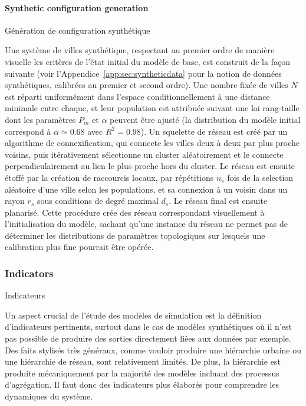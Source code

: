 \paragraph{Synthetic configuration generation}{Génération de configuration synthétique}

Une système de villes synthétique, respectant au premier ordre de manière visuelle les critères de l'état initial du modèle de base, est construit de la façon suivante (voir l'Appendice~\ref{app:sec:syntheticdata} pour la notion de données synthétiques, calibrées au premier et second ordre). Une nombre fixée de villes $N$ est réparti uniformément dans l'espace conditionnellement à une distance minimale entre chaque, et leur population est attribuée suivant une loi rang-taille dont les paramètres $P_{m}$ et $\alpha$ peuvent être ajusté (la distribution du modèle initial correspond à $\alpha\simeq 0.68$ avec $R^2=0.98$). Un squelette de réseau est créé par un algorithme de connexification, qui connecte les villes deux à deux par plus proche voisins, puis itérativement sélectionne un cluster aléatoirement et le connecte perpendiculairement au lien le plus proche hors du cluster. Le réseau est ensuite étoffé par la création de raccourcis locaux, par répétitions $n_s$ fois de la selection aléatoire d'une ville selon les populations, et sa connexion à un voisin dans un rayon $r_s$ sous conditions de degré maximal $d_s$. Le réseau final est ensuite planarisé. Cette procédure crée des réseau correspondant visuellement à l'initialisation du modèle, sachant qu'une instance du réseau ne permet pas de déterminer les distributions de paramètres topologiques sur lesquels une calibration plus fine pourrait être opérée.


\subsubsection{Indicators}{Indicateurs}

Un aspect crucial de l'étude des modèles de simulation est la définition d'indicateurs pertinents, surtout dans le cas de modèles synthétiques où il n'est pas possible de produire des sorties directement liées aux données par exemple. Des faits stylisés très généraux, comme vouloir produire une hiérarchie urbaine ou une hiérarchie de réseau, sont relativement limités. %
 De plus, la hiérarchie est produite mécaniquement par la majorité des modèles incluant des processus d'agrégation. Il faut donc des indicateurs plus élaborés pour comprendre les dynamiques du système.


